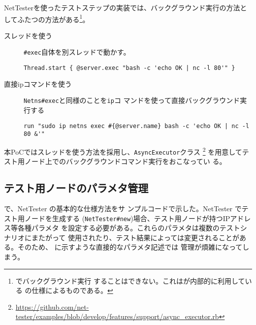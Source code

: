NetTesterを使ったテストステップの実装では、バックグラウンド実行の方法と
してふたつの方法がある\footnote{でバックグラウンド実行
することはできない。これはが内部的に利用している
の仕様によるものである。}。
\begin{description}
 \item[スレッドを使う] \verb|#exec|自体を別スレッドで動かす。
\begin{lstlisting}
Thread.start { @server.exec "bash -c 'echo OK | nc -l 80'" }
\end{lstlisting}
 \item[直接ipコマンドを使う] \verb|Netns#exec|と同様のことを\verb|ip|コ
            マンドを使って直接バックグラウンド実行する
\begin{lstlisting}
run "sudo ip netns exec #{@server.name} bash -c 'echo OK | nc -l 80 &'"
\end{lstlisting}
\end{description}

本PoCではスレッドを使う方法を採用し、\verb|AsyncExecutor|クラス
\footnote{\url{https://github.com/net-tester/examples/blob/develop/features/support/async_executor.rb}}
を用意してテスト用ノード上でのバックグラウンドコマンド実行をおこなってい
る。

  \subsection{テスト用ノードのパラメタ管理}
  \label{sec:test-parameter-management}

で、NetTester の基本的な仕様方法をサ
ンプルコードで示した。NetTester でテスト用ノードを生成する
(\verb|NetTester#new|)場合、テスト用ノードが持つIPアドレス等各種パラメタ
を設定する必要がある。これらのパラメタは複数のテストシナリオにまたがって
使用されたり、テスト結果によっては変更されることがある。そのため、
に示すような直接的なパラメタ記述では
管理が煩雑になってしまう。

